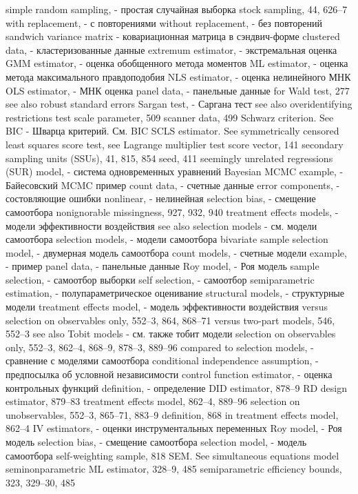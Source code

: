 simple random sampling, - простая случайная выборка
stock sampling, 44, 626–7
with replacement, - с повторениями
without replacement, - без повторений
sandwich variance matrix - ковариационная матрица в сэндвич-форме
clustered data, - кластеризованные данные
extremum estimator, - экстремальная оценка
GMM estimator, - оценка обобщенного метода моментов
ML estimator, - оценка метода максимального правдоподобия
NLS estimator, - оценка нелинейного МНК
OLS estimator, - МНК оценка
panel data, - панельные данные
for Wald test, 277
see also robust standard errors 
Sargan test, - Саргана тест
see also overidentifying restrictions test scale parameter, 509
scanner data, 499
Schwarz criterion. See BIC - Шварца критерий. См. BIC
SCLS estimator. See symmetrically censored least squares
score test, see Lagrange multiplier test
score vector, 141
secondary sampling units (SSUs), 41, 815, 854 seed, 411
seemingly unrelated regressions (SUR) model, - система одновременных уравнений
Bayesian MCMC example, - Байесовский MCMC пример
count data, - счетные данные
error components, - состовляющие ошибки
nonlinear, - нелинейная
selection bias, - смещение самоотбора
nonignorable missingness, 927, 932, 940 
treatment effects models, - модели эффективности воздействия
see also selection models - см. модели самоотбора
selection models, - модели самоотбора
bivariate sample selection model, - двумерная модель самоотбора
count models, - счетные модели
example, - пример
panel data, - панельные данные
Roy model, - Роя модель
sample selection, - самоотбор выборки
self selection, - самоотбор
semiparametric estimation, - полупараметрическое оценивание
structural models, - структурные модели
treatment effects model, - модель эффективности воздействия
versus selection on observables only, 552–3, 864,
868–71
versus two-part models, 546, 552–3 
see also Tobit models - см. также тобит модели
selection on observables only, 552–3, 862–4, 868–9, 878–3, 889–96
compared to selection models, - сравнение с моделями самоотбора
conditional independence assumption, - предпосылка об условной независимости
control function estimator, - оценка контрольных функций
definition, - определение
DID estimator, 878–9
RD design estimator, 879–83
treatment effects model, 862–4, 889–96
selection on unobservables, 552–3, 865–71, 883–9 definition, 868
in treatment effects model, 862–4
IV estimators, - оценки инструментальных переменных
Roy model, - Роя модель
selection bias, - смещение самоотбора
selection model, - модель самоотбора
self-weighting sample, 818
SEM. See simultaneous equations model seminonparametric ML estimator, 328–9, 485 semiparametric efficiency bounds, 323, 329–30, 485 
